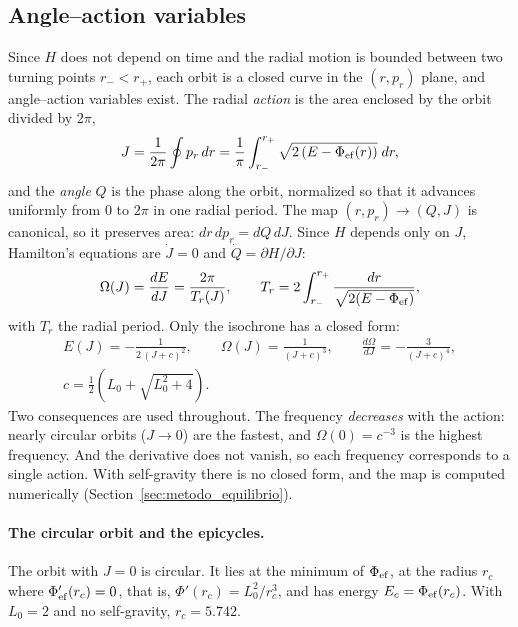 \documentclass[11pt,a4paper]{article}
\begin{document}
\subsection{Angle--action variables}
\label{sec:aa}
\label{sec:circular}

Since $H$ does not depend on time and the radial motion is bounded between two
turning points $r_-<r_+$, each orbit is a closed curve in the $(r,p_r)$ plane, and
angle--action variables exist. The radial \emph{action} is the area enclosed by the
orbit divided by $2\pi$,
\[
  J = \frac{1}{2\pi}\oint p_r\,dr
    = \frac{1}{\pi}\int_{r_-}^{r_+} \sqrt{2\,(E-\Phi_{\rm ef}(r))}\;dr ,
\]
and the \emph{angle} $Q$ is the phase along the orbit, normalized so that it advances
uniformly from $0$ to $2\pi$ in one radial period. The map $(r,p_r)\to(Q,J)$ is
canonical, so it preserves area: $dr\,dp_r=dQ\,dJ$. Since $H$ depends only on $J$,
Hamilton's equations are $\dot J=0$ and $\dot Q=\partial H/\partial J$:
\[
  \Omega(J) = \frac{dE}{dJ} = \frac{2\pi}{T_r(J)}, \qquad
  T_r = 2\int_{r_-}^{r_+}\frac{dr}{\sqrt{2(E-\Phi_{\rm ef})}} ,
\]
with $T_r$ the radial period. Only the isochrone has a closed form:
\begin{gather*}
  E(J) = -\frac{1}{2\,(J+c)^2}, \qquad
  \Omega(J) = \frac{1}{(J+c)^3}, \qquad
  \frac{d\Omega}{dJ} = -\frac{3}{(J+c)^4},\\
  c = \tfrac12\left(L_0+\sqrt{L_0^2+4}\right).
\end{gather*}
Two consequences are used throughout. The frequency \emph{decreases} with the action:
nearly circular orbits ($J\to0$) are the fastest, and $\Omega(0) = c^{-3}$ is the highest
frequency. And the derivative does not vanish, so each frequency corresponds to a single
action. With self-gravity there is no closed form, and the map is computed numerically
(Section~\ref{sec:metodo_equilibrio}).

\paragraph{The circular orbit and the epicycles.} The orbit with $J=0$ is circular. It
lies at the minimum of $\Phi_{\rm ef}$, at the radius $r_c$ where $\Phi_{\rm ef}'(r_c)=0$, that is,
$\Phi'(r_c)=L_0^2/r_c^3$, and has energy $E_c=\Phi_{\rm ef}(r_c)$. With $L_0=2$ and no
self-gravity, $r_c=5.742$.
\end{document}
